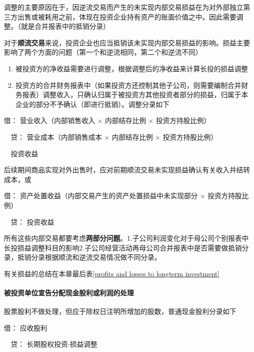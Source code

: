 \documentclass[UTF8,12pt]{ctexart}
\newenvironment{Dr}{\noindent 借：}{\par}
\newenvironment{Cr}{\noindent \ \ 贷：}{\par}
\numberwithin{equation}{section} %
\numberwithin{figure}{section}
\numberwithin{table}{section}
\begin{document}
	调整的主要原因在于，因逆流交易而产生的未实现内部交易损益在为对外部独立第三方出售或被耗用之前，体现在投资企业持有资产的账面价值之中。因此需要调整。（就是合并报表中的抵销分录）
	
	对于\textbf{顺流交易}来说，投资企业也应当抵销该未实现内部交易损益的影响。损益主要影响了两个方面的问题（第一个和逆流相同，第二个和逆流不同）
	\begin{enumerate}
		\item 被投资方的净收益需要进行调整，根据调整后的净收益来计算长投的损益调整
		
		\item 投资方的合并财务报表中（如果投资方还控制其他子公司，则需要编制合并财务报表）调整收入，只确认归属于被投资方其他投资者部分的损益，归属于本企业的部分不予确认（即进行抵销）。调整分录如下
	\end{enumerate}
	
	\begin{Dr}
		营业收入（内部销售收入 $\times$ 内部结存比例 $\times$ 投资方持股比例）
	\end{Dr}
	\begin{Cr}
		营业成本（内部销售成本 $\times$ 内部结存比例 $\times$ 投资方持股比例）
		
		\ \ 投资收益
	\end{Cr}
	
	后续期间商品实现对外出售时，应对前期顺流交易未实现损益确认有关收入并结转成本，或
	
	\begin{Dr}
		资产处置收益（内部交易产生的资产处置损益中未实现部分 $\times$ 投资方持股比例）
	\end{Dr}
	\begin{Cr}
		投资收益 
	\end{Cr}
	
	
	所有这些内部交易都要考虑\textbf{两部分问题}。1.子公司利润变化对于母公司个别报表中长投损益调整科目的影响2.子公司经营活动再母公司合并报表中是否需要做抵销分录，抵销分录根据顺流和逆流交易情况做不同分录。
	
	有关损益的总结在本章最后表\ref{profits and losses to longterm investment}
	
	
	
	
	\paragraph{被投资单位宣告分配现金股利或利润的处理}股票股利不做处理，但应于除权日注明所增加的股数，普通现金股利分录如下
	
	\begin{Dr}
		应收股利
	\end{Dr}
	\begin{Cr}
		长期股权投资-损益调整
	\end{Cr}
	
\end{document}

